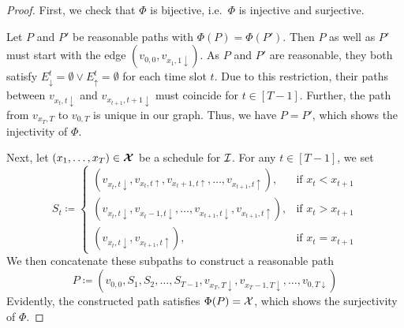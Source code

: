 \begin{proof}
First, we check that $\Phi$ is bijective, i.e.\ $\Phi$ is injective and surjective. 

Let $P$ and $P'$ be reasonable paths with $\Phi(P)=\Phi(P')$. Then $P$ as well as $P'$ must start with the edge $(v_{0,0},v_{x_1,1\downarrow})$. As $P$ and $P'$ are reasonable, they both satisfy $E_\downarrow^t=\emptyset \lor E_\uparrow^t=\emptyset$ for each time slot $t$. Due to this restriction, their paths between $v_{x_t,t\downarrow}$ and $v_{x_{t+1},t+1\downarrow}$ must coincide for $t\in[T-1]$. Further, the path from $v_{x_T,T}$ to $v_{0,T}$ is unique in our graph. Thus, we have $P=P'$, which shows the injectivity of $\Phi$.

Next, let $(x_1,\ldots,x_T)\in\bm{\mathcal{X}}$ be a schedule for $\mathcal{I}$. For any $t\in[T-1]$, we set
\begin{equation*}
	S_t\coloneqq
	\begin{cases}
		(v_{x_t,t\downarrow},v_{x_t,t\uparrow},v_{x_t+1,t\uparrow},\ldots,v_{x_{t+1},t\uparrow}), & \text{if $x_t<x_{t+1}$}\\
		(v_{x_t,t\downarrow},v_{x_t-1,t\downarrow},\ldots,v_{x_{t+1},t\downarrow},v_{x_{t+1},t\uparrow}), & \text{if $x_t>x_{t+1}$}\\
		(v_{x_t,t\downarrow},v_{x_{t+1},t\uparrow}), & \text{if $x_t=x_{t+1}$}
	\end{cases}
\end{equation*}
We then concatenate these subpaths to construct a reasonable path
\begin{equation*}
	P\coloneqq(v_{0,0},S_1,S_2,\ldots,S_{T-1},v_{x_T,T\downarrow},v_{x_T-1,T\downarrow},\ldots,v_{0,T\downarrow})
\end{equation*}
Evidently, the constructed path satisfies $\Phi(P)=\mathcal{X}$, which shows the surjectivity of $\Phi$.


\end{proof}
